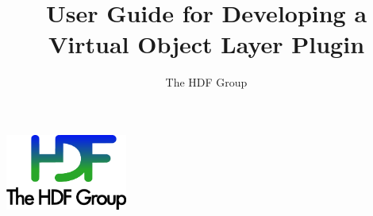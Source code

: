 \documentclass[10pt,a4paper]{article}
\title{User Guide for Developing a Virtual Object Layer Plugin}
\author{The HDF Group}
\begin{document}
\maketitle
\thispagestyle{empty}

\vfill
\begin{center}
\includegraphics[width=4cm]{THG_LOGO.pdf} %
\end{center}
\vfill
\vfill

\newpage
{}
\tableofcontents
\newpage


\renewcommand\appendixtocname{Appendix}


\newpage









\end{document}
